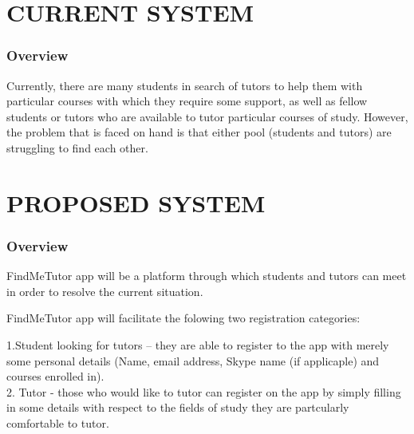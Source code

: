 \documentclass[12pt]{article}
\begin{document}
\section{CURRENT SYSTEM}
\subsubsection{Overview}
\begin{flushleft}
Currently, there are many students in search of tutors to help them with particular courses with which they require some support, as well as fellow students or tutors who are available to tutor particular courses of study. However, the problem that is faced on hand is that either pool (students and tutors) are struggling to find each other. 
\end{flushleft}

\section{PROPOSED SYSTEM}
\subsubsection{Overview}
\begin{flushleft}
FindMeTutor app will be a platform through which students and tutors can meet in order to resolve the current situation. 
\end{flushleft}
\begin{flushleft}
FindMeTutor app will facilitate the folowing two registration categories: 

\begin{flushleft}
1.Student looking for tutors – they are able to  register to the app with merely some personal details (Name, email address, Skype name (if applicaple) and courses enrolled in).\\
2. Tutor - those who would like to tutor can register on the app by simply filling in some details with respect to the fields of study they are partcularly comfortable to tutor.\\
\end{flushleft}
\end{flushleft}
\end{document}
